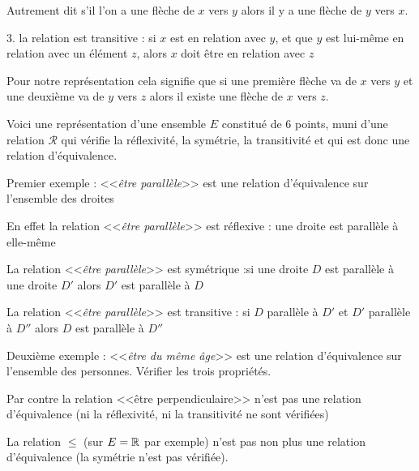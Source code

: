 \change

Autrement dit s'il l'on a une flèche de $x$ vers $y$ alors il y a une flèche de $y$ vers $x$.

\change

3. la relation est transitive : si $x$ est en relation avec $y$, et que $y$ est lui-même en relation avec un
élément $z$, alors $x$ doit être en relation avec $z$

\change

Pour notre représentation cela signifie que si une première flèche va de $x$ vers $y$
et une deuxième va de $y$ vers $z$ alors il existe une flèche de $x$ vers $z$.

\change

Voici une représentation d'une ensemble $E$ constitué de $6$ points,
muni d'une relation $\mathcal{R}$ qui vérifie la réflexivité, la symétrie, la transitivité
et qui est donc une relation d'équivalence.

\diapo

Premier exemple :  <<\emph{être parallèle}>> est une relation d'équivalence 
sur l'ensemble des droites

\change

En effet la relation <<\emph{être parallèle}>> est réflexive : une droite est parallèle à elle-même

\change

La relation <<\emph{être parallèle}>> est symétrique :si une droite $D$ est parallèle à une droite $D'$ alors $D'$ est parallèle à $D$

\change

La relation <<\emph{être parallèle}>> est transitive : si $D$ parallèle à $D'$ et $D'$ parallèle à $D''$ 
alors $D$ est parallèle à $D''$

\change


Deuxième exemple : <<\emph{être du même âge}>> est une relation d'équivalence sur l'ensemble des personnes.
Vérifier les trois propriétés.

\change

Par contre la relation <<être perpendiculaire>> n'est pas une relation d'équivalence 
(ni la réflexivité, ni la transitivité ne sont vérifiées) 
 

\change

La relation $\le$ (sur $E=\mathbb{R}$ par exemple) n'est pas non plus une relation d'équivalence
(la symétrie n'est pas vérifiée).


\diapo

